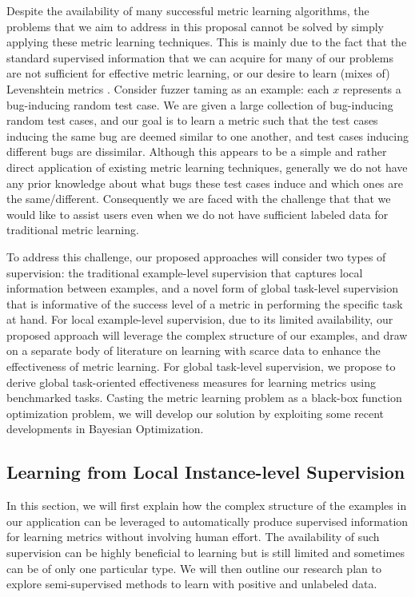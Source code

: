 Despite the availability of many successful metric learning
algorithms, the problems that we aim to address in this proposal
cannot be solved by simply applying these metric learning
techniques. This is mainly due to the fact that the standard
supervised information that we can acquire for many of our problems
are not sufficient for effective metric learning, or our desire to
learn (mixes of) Levenshtein metrics \cite{lev}.  Consider fuzzer
taming as an example: each $x$ represents a bug-inducing random test
case. We are given a large collection of bug-inducing random test
cases, and our goal is to learn a metric such that the test cases
inducing the same bug are deemed similar to one another, and test
cases inducing different bugs are dissimilar. Although this appears to
be a simple and rather direct application of existing metric learning
techniques, generally we do not have any prior knowledge about what
bugs these test cases induce and which ones are the
same/different. Consequently we are faced with the challenge that that
we would like to assist users even when we do not have sufficient
labeled data for traditional metric learning.

To address this challenge, our proposed approaches will consider two
types of supervision: the traditional example-level supervision that
captures local information between examples, and a novel form of
global task-level supervision that is informative of the success level
of a metric in performing the specific task at hand.  For local
example-level supervision, due to its limited availability, our
proposed approach will leverage the complex structure of our
examples, and draw on a separate body of literature on learning with
scarce data to enhance the effectiveness of metric learning. For
global task-level supervision, we propose to derive global
task-oriented effectiveness measures for learning metrics using
benchmarked tasks. Casting the metric learning problem as a black-box
function optimization problem, we will develop our solution by
exploiting some recent developments in Bayesian Optimization.

\subsection{Learning from Local Instance-level Supervision}
In this section, we will first explain how the complex structure of
the examples in our application can be leveraged to automatically
produce supervised information for learning metrics without involving
human effort.  The availability of such supervision can be highly
beneficial to learning but is still limited and sometimes can be of
only one particular type. We will then outline our research plan to explore
semi-supervised methods to learn with positive and unlabeled data.

